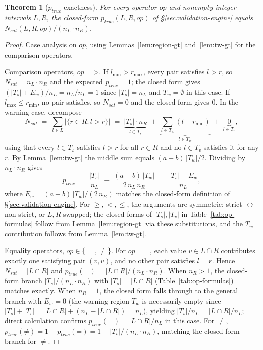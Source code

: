 \documentclass[pdflatex,sn-basic]{sn-jnl}%
\theoremstyle{thmstyleone}%
\newtheorem{theorem}{Theorem}%
\theoremstyle{thmstyletwo}%
\theoremstyle{thmstylethree}%
\begin{document}
\begin{theorem}[$p_{\mathit{true}}$ exactness]\label{thm:p-true-exact}
For every operator $op$ and nonempty integer intervals $L, R$, the closed-form $p_{\mathit{true}}(L, R, op)$ of §\ref{sec:validation-engine} equals $N_{\mathit{sat}}(L, R, op) / (n_L \cdot n_R)$.
\end{theorem}

\begin{proof}
Case analysis on $op$, using Lemmas~\ref{lem:region-gt} and~\ref{lem:tw-gt} for the comparison operators.

Comparison operators, $op = \mathord{>}$.
If $l_{\min} > r_{\max}$, every pair satisfies $l > r$, so $N_{\mathit{sat}} = n_L \cdot n_R$ and the expected $p_{\mathit{true}} = 1$; the closed form gives $(|T_s| + E_w) / n_L = n_L / n_L = 1$ since $|T_s| = n_L$ and $T_w = \emptyset$ in this case.
If $l_{\max} \leq r_{\min}$, no pair satisfies, so $N_{\mathit{sat}} = 0$ and the closed form gives $0$.
In the warning case, decompose
\[
N_{\mathit{sat}} \;=\; \sum_{l \in L} \big|\{r \in R : l > r\}\big| \;=\; \underbrace{|T_s| \cdot n_R}_{l \in T_s} \;+\; \underbrace{\textstyle\sum_{l \in T_w} (l - r_{\min})}_{l \in T_w} \;+\; \underbrace{0}_{l \in T_v},
\]
using that every $l \in T_s$ satisfies $l > r$ for all $r \in R$ and no $l \in T_v$ satisfies it for any $r$. By Lemma~\ref{lem:tw-gt} the middle sum equals $(a + b)\, |T_w| / 2$. Dividing by $n_L \cdot n_R$ gives
\[
p_{\mathit{true}} \;=\; \frac{|T_s|}{n_L} \;+\; \frac{(a + b)\, |T_w|}{2\, n_L\, n_R} \;=\; \frac{|T_s| + E_w}{n_L},
\]
where $E_w = (a + b)\, |T_w| / (2\, n_R)$ matches the closed-form definition of §\ref{sec:validation-engine}.
For $\geq, <, \leq$, the arguments are symmetric: strict $\leftrightarrow$ non-strict, or $L, R$ swapped; the closed forms of $|T_s|, |T_v|$ in Table~\ref{tab:op-formulas} follow from Lemma~\ref{lem:region-gt} via these substitutions, and the $T_w$ contribution follows from Lemma~\ref{lem:tw-gt}.

Equality operators, $op \in \{=, \neq\}$.
For $op = \mathord{=}$, each value $v \in L \cap R$ contributes exactly one satisfying pair $(v, v)$, and no other pair satisfies $l = r$. Hence $N_{\mathit{sat}} = |L \cap R|$ and $p_{\mathit{true}}(\mathord{=}) = |L \cap R| / (n_L \cdot n_R)$.
When $n_R > 1$, the closed-form branch $|T_s| / (n_L \cdot n_R)$ with $|T_s| = |L \cap R|$ (Table~\ref{tab:op-formulas}) matches exactly.
When $n_R = 1$, the closed form falls through to the general branch with $E_w = 0$ (the warning region $T_w$ is necessarily empty since $|T_s| + |T_v| = |L \cap R| + (n_L - |L \cap R|) = n_L$), yielding $|T_s| / n_L = |L \cap R| / n_L$; direct calculation confirms $p_{\mathit{true}}(\mathord{=}) = |L \cap R| / n_L$ in this case.
For $\neq$, $p_{\mathit{true}}(\mathord{\neq}) = 1 - p_{\mathit{true}}(\mathord{=}) = 1 - |T_v| / (n_L \cdot n_R)$, matching the closed-form branch for $\neq$.


\end{proof}
\end{document}
